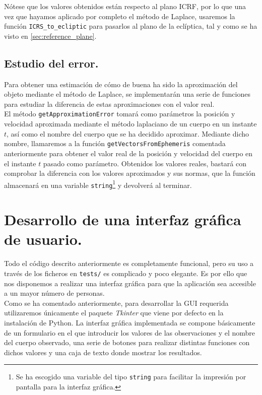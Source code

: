 \documentclass[11pt]{book}
\begin{document}
Nótese que los valores obtenidos están respecto al plano ICRF, por lo que una vez que hayamos aplicado por completo el método de Laplace, usaremos la función \texttt{ICRS\_to\_ecliptic} para pasarlos al plano de la eclíptica, tal y como se ha visto en \ref{sec:reference_plane}.\\

\subsection{Estudio del error.}
Para obtener una estimación de cómo de buena ha sido la aproximación del objeto mediante el método de Laplace, se implementarán una serie de funciones para estudiar la diferencia de estas aproximaciones con el valor real.\\

El método \texttt{getApproximationError} tomará como parámetros la posición y velocidad aproximada mediante el método laplaciano de un cuerpo en un instante $t$, así como el nombre del cuerpo que se ha decidido aproximar. Mediante dicho nombre, llamaremos a la función \texttt{getVectorsFromEphemeris} comentada anteriormente para obtener el valor real de la posición y velocidad del cuerpo en el instante $t$ pasado como parámetro. Obtenidos los valores reales, bastará con comprobar la diferencia con los valores aproximados y sus normas, que la función almacenará en una variable \texttt{string}\footnote{Se ha escogido una variable del tipo \texttt{string} para facilitar la impresión por pantalla para la interfaz gráfica.} y devolverá al terminar.\\

\section{Desarrollo de una interfaz gráfica de usuario.}
Todo el código descrito anteriormente es completamente funcional, pero su uso a través de los ficheros en \texttt{tests/} es complicado y poco elegante. Es por ello que nos disponemos a realizar una interfaz gráfica para que la aplicación sea accesible a un mayor número de personas.\\

Como se ha comentado anteriormente, para desarrollar la GUI requerida utilizaremos únicamente el paquete \textit{Tkinter} que viene por defecto en la instalación de Python. La interfaz gráfica implementada se compone básicamente de un formulario en el que introducir los valores de las observaciones y el nombre del cuerpo observado, una serie de botones para realizar distintas funciones con dichos valores y una caja de texto donde mostrar los resultados.
\end{document}
